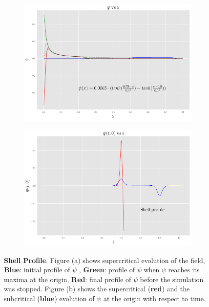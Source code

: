 \begin{figure}
    \centering
    \begin{subfigure}[b]{0.85\textwidth}
        \includegraphics[width=1\linewidth]{images/super_shell.pdf}
        \caption{}
        \label{fig:shell}
    \end{subfigure}

    \begin{subfigure}[b]{0.85\textwidth}
        \includegraphics[width=1\linewidth]{images/at0_shell.pdf}
        \caption{}
        \label{fig:at0_shell}
    \end{subfigure}
    \caption[Evolution of $\psi$ from an initial shell profile]{\textbf{Shell Profile}. Figure (a) shows supercritical evolution of the field, \textbf{Blue}: initial profile of $\psi$ , \textbf{Green}: profile of $\psi$ when $\psi$ reaches its maxima at the origin, \textbf{Red}: final profile of $\psi$ before the simulation was stopped. Figure (b) shows the supercritical (\textbf{red}) and the subcritical (\textbf{blue}) evolution of $\psi$ at the origin with respect to time.}
\end{figure}
